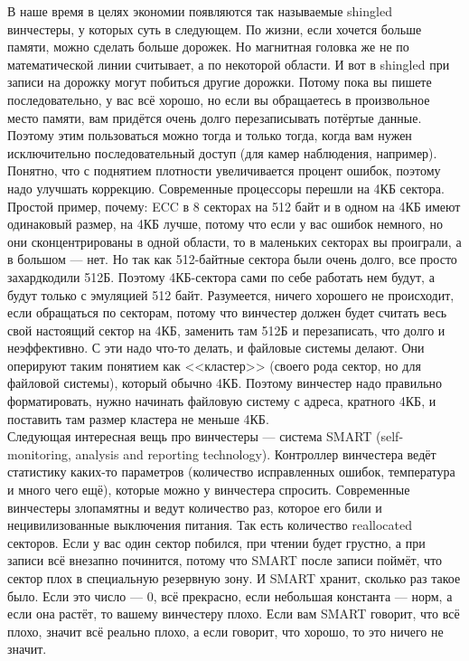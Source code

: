 \documentclass{article}
\begin{document}
    В наше время в целях экономии появляются так называемые shingled винчестеры, у которых суть в следующем. По жизни, если хочется больше памяти, можно сделать больше дорожек. Но магнитная головка же не по математической линии считывает, а по некоторой области. И вот в shingled при записи на дорожку могут побиться другие дорожки. Потому пока вы пишете последовательно, у вас всё хорошо, но если вы обращаетесь в произвольное место памяти, вам придётся очень долго перезаписывать потёртые данные. Поэтому этим пользоваться можно тогда и только тогда, когда вам нужен исключительно последовательный доступ (для камер наблюдения, например).\\
    Понятно, что с поднятием плотности увеличивается процент ошибок, поэтому надо улучшать коррекцию. Современные процессоры перешли на 4КБ сектора. Простой пример, почему: ECC в 8 секторах на 512 байт и в одном на 4КБ имеют одинаковый размер, на 4КБ лучше, потому что если у вас ошибок немного, но они сконцентрированы в одной области, то в маленьких секторах вы проиграли, а в большом --- нет. Но так как 512-байтные сектора были очень долго, все просто захардкодили 512Б. Поэтому 4КБ-сектора сами по себе работать нем будут, а будут только с эмуляцией 512 байт. Разумеется, ничего хорошего не происходит, если обращаться по секторам, потому что винчестер должен будет считать весь свой настоящий сектор на 4КБ, заменить там 512Б и перезаписать, что долго и неэффективно. С эти надо что-то делать, и файловые системы делают. Они оперируют таким понятием как <<кластер>> (своего рода сектор, но для файловой системы), который обычно 4КБ. Поэтому винчестер надо правильно форматировать, нужно начинать файловую систему с адреса, кратного 4КБ, и поставить там размер кластера не меньше 4КБ.\\
    Следующая интересная вещь про винчестеры --- система SMART (self-monitoring, analysis and reporting technology). Контроллер винчестера ведёт статистику каких-то параметров (количество исправленных ошибок, температура и много чего ещё), которые можно у винчестера спросить. Современные винчестеры злопамятны и ведут количество раз, которое его били и нецивилизованные выключения питания. Так есть количество reallocated секторов. Если у вас один сектор побился, при чтении будет грустно, а при записи всё внезапно починится, потому что SMART после записи поймёт, что сектор плох в специальную резервную зону. И SMART хранит, сколько раз такое было. Если это число --- 0, всё прекрасно, если небольшая константа --- норм, а если она растёт, то вашему винчестеру плохо. Если вам SMART говорит, что всё плохо, значит всё реально плохо, а если говорит, что хорошо, то это ничего не значит.
\end{document}
